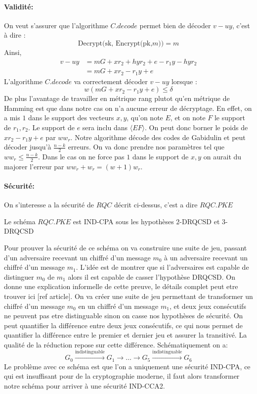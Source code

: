 \documentclass[12pt]{article}
\begin{document}
\paragraph{Validité:} On veut s'assurer que l'algorithme $C.decode$ permet bien de décoder $v-uy$, c'est à dire :
$$\text{Decrypt(sk, Encrypt(pk,}m)) = m$$
Ainsi,
\begin{align*}
    v - uy &= mG +xr_2 + hyr_2+e - r_1y - hyr_2 \\
        &= mG + xr_2 - r_1y +e
\end{align*}
L'algorithme $C.decode$ va correctement décoder $v - uy$ lorsque :
$$ w (mG + xr_2 - r_1y +e) \leq \delta $$
De plus l'avantage de travailler en métrique rang plutot qu'en métrique de Hamming est que dans notre cas on n'a aucune erreur de décryptage. En effet, on a mis $1$ dans le support des vecteurs $x,y$, qu'on note $E$, et on note $F$ le support de $r_1, r_2$. Le support de $e$ sera inclu dans $\langle EF \rangle$. On peut donc borner le poids de $xr_2 - r_1y +e$ par $ww_r$. Notre algorithme décode des codes de Gabidulin et peut décoder jusqu'à $\frac{n-k}{2}$ erreurs. On va donc prendre nos paramètres tel que $ww_r \leq \frac{n-k}{2}$. Dans le cas on ne force pas $1$ dans le support de $x,y$ on aurait du majorer l'erreur par $ww_r + w_r = (w+1)w_r$.

\paragraph{Sécurité:}
On s'interesse a la sécurité de $RQC$ décrit ci-dessus, c'est a dire $RQC.PKE$
\begin{thm}
Le schéma $RQC.PKE$ est IND-CPA sous les hypothèses $2$-DRQCSD et $3$-DRQCSD
\end{thm}

Pour prouver la sécurité de ce schéma on va construire une suite de jeu, passant d'un adversaire recevant un chiffré d'un message $m_0$ à un adversaire recevant un chiffré d'un message $m_1$. L'idée est de montrer que si l'adversaires est capable de distinguer $m_0$ de $m_1$ alors il est capable de casser l'hypothèse DRQCSD.
\newline
On donne une explication informelle de cette preuve, le détails complet peut etre trouver ici [ref article]. On va créer une suite de jeu permettant de transformer un chiffré d'un message $m_0$ en un chiffré d'un message $m_1$, et deux jeux consécutifs ne peuvent pas etre distinguable sinon on casse nos hypothèses de sécurité. On peut quantifier la différence entre deux jeux consécutifs, ce qui nous permet de quantifier la différence entre le premier et dernier jeu et assurer la transitivé. La qualité de la réduction repose sur cette différence. Schématiquement on a:
$$ G_0 \xrightarrow{\text{indistinguable}} G_1 \rightarrow \ldots \rightarrow G_5 \xrightarrow{\text{indistinguable}} G_6$$
Le problème avec ce schéma est que l'on a uniquement une sécurité IND-CPA, ce qui est insuffisant pour de la cryptographie moderne, il faut alors transformer notre schéma pour arriver à une sécurité IND-CCA2.
\end{document}

